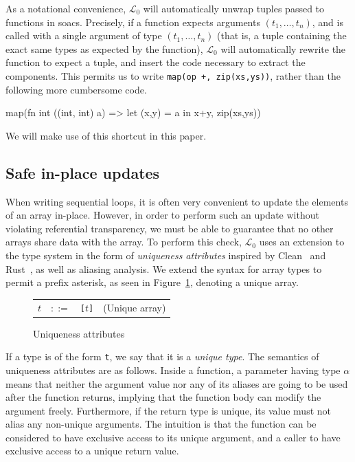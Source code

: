 \documentclass{sigplanconf}  %
\newcommand{\LO}{$\mathcal{L}_0$}
\begin{document}
As a notational convenience, \LO{} will automatically unwrap tuples
passed to functions in {\sc soac}s.  Precisely, if a function expects
arguments $(t_{1},\ldots,t_{n})$, and is called with a single argument
of type $(t_{1},\ldots,t_{n})$ (that is, a tuple containing the exact
same types as expected by the function), \LO{} will automatically
rewrite the function to expect a tuple, and insert the code necessary
to extract the components.  This permits us to write {\tt map(op +,
  zip(xs,ys))}, rather than the following more cumbersome code.
\begin{colorcode}
  map(fn int ((int, int) a) => let (x,y) = a in x+y,
      zip(xs,ys))
\end{colorcode}
We will make use of this shortcut in this paper.

\subsection{Safe in-place updates}
\label{sec:in-place}

When writing sequential loops, it is often very convenient to update
the elements of an array in-place.  However, in order to perform such
an update without violating referential transparency, we must be able
to guarantee that no other arrays share data with the array.  To
perform this check, \LO{} uses an extension to the type system in the
form of {\em uniqueness attributes} inspired by
Clean~\cite{clean-uniqueness-types} and Rust~\cite{rust}, as well as
aliasing analysis.  We extend the syntax for array types to permit a
prefix asterisk, as seen in Figure~\ref{fig:uniqueness-types},
denoting a unique array.

\begin{figure}[bt]
\begin{tabular}{lrll}
$t$ & $::=$ & {\tt *[$t$]} & (Unique array) \\
\end{tabular}
\caption{Uniqueness attributes}
\label{fig:uniqueness-types}
\end{figure}

If a type is of the form {\tt *t}, we say that it is a {\em unique
  type}.  The semantics of uniqueness attributes are as follows.
Inside a function, a parameter having type {\tt *$\alpha$} means that
neither the argument value nor any of its aliases are going to be used
after the function returns, implying that the function body can modify
the argument freely.  Furthermore, if the return type is unique, its
value must not alias any non-unique arguments.  The intuition is that
the function can be considered to have exclusive access to its unique
argument, and a caller to have exclusive access to a unique return
value.
\end{document}
